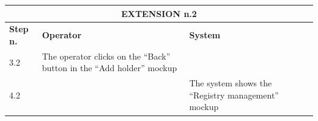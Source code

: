 {{{			\begin{table}[h]
			\begin{tabular}{|p{2cm}|p{6cm}|p{6cm}|}
			\hline
				\multicolumn{3}{|c|}{EXTENSION n.2}\\
			\hline
				\centering \vspace{1mm} \bfseries{Step n.} \vspace{1mm} & \vspace{1mm} \bfseries{Operator} \vspace{1mm} & \vspace{1mm} \bfseries{System} \vspace{1mm}\\
			\hline
				\vspace{1mm} 3.2 \vspace{1mm} &
				\vspace{1mm} The operator clicks on the “Back” button in the “Add holder”  mockup \vspace{1mm} & 
				\vspace{1mm} \vspace{1mm} \\
			\hline
				\vspace{1mm} 4.2 \vspace{1mm} &
				\vspace{1mm} \vspace{1mm} & 
				\vspace{1mm} The system shows the “Registry management” mockup \vspace{1mm} \\
			\hline
			\end{tabular}
			\end{table}
			
			\clearpage
		}			
	}
}